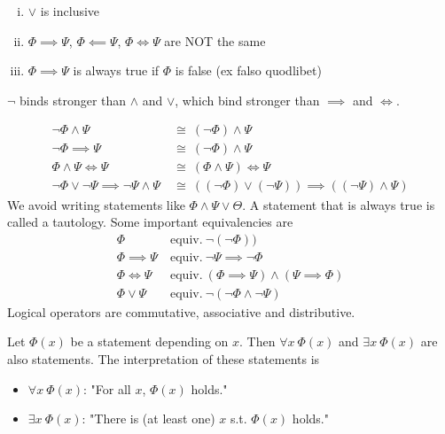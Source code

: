 \documentclass[../../script.tex]{subfiles}
\begin{document}
\begin{rem}\leavevmode
\begin{enumerate}[(i)]
	\item $\vee$ is inclusive
	\item $\Phi \implies \Psi$, $\Phi \impliedby \Psi$, $\Phi \iff \Psi$ are NOT the same
	\item $\Phi \implies \Psi$ is always true if $\Phi$ is false (ex falso quodlibet)
\end{enumerate}
\end{rem}

\begin{defi}
$\neg$ binds stronger than $\wedge$ and $\vee$, which bind stronger than $\implies$ and $\iff$.
\end{defi}

\begin{eg}\leavevmode
\begin{align*}
	\neg\Phi \wedge \Psi ~&\cong~ (\neg\Phi) \wedge \Psi \\
	\neg\Phi \implies \Psi ~&\cong~ (\neg\Phi) \wedge \Psi \\
	\Phi \wedge \Psi \iff \Psi ~&\cong~ (\Phi \wedge \Psi) \iff \Psi \\
	\neg\Phi \vee \neg\Psi \implies \neg\Psi \wedge \Psi ~&\cong~ ((\neg\Phi) \vee (\neg\Psi)) \implies ((\neg\Psi) \wedge \Psi)
\end{align*}
We avoid writing statements like $\Phi \wedge \Psi \vee \Theta$. A statement that is always true is called a tautology. Some important equivalencies are
\begin{align*}
	\Phi ~&\text{equiv.}~ \neg(\neg\Phi)) \\
	\Phi \implies \Psi ~&\text{equiv.}~ \neg\Psi \implies \neg\Phi \\
	\Phi \iff \Psi ~&\text{equiv.}~ (\Phi \implies \Psi) \wedge (\Psi \implies \Phi) \\
	\Phi \vee \Psi ~&\text{equiv.}~ \neg(\neg\Phi \wedge \neg\Psi)
\end{align*}
Logical operators are commutative, associative and distributive. 
\end{eg}

\begin{defi}[Quantifiers]
Let $\Phi(x)$ be a statement depending on $x$. Then $\forall x ~\Phi(x)$ and $\exists x ~\Phi(x)$ are also statements. The interpretation of these statements is
\begin{itemize}
	\item $\forall x ~\Phi(x)$: "For all $x$, $\Phi(x)$ holds."
	\item $\exists x ~\Phi(x)$: "There is (at least one) $x$ s.t. $\Phi(x)$ holds."
\end{itemize}
\end{defi}
\end{document}
